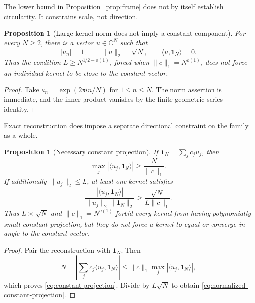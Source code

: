 \documentclass[11pt]{amsart}
\numberwithin{equation}{section}
\theoremstyle{plain}
\newtheorem{proposition}[theorem]{Proposition}
\theoremstyle{definition}
\theoremstyle{remark}
\newcommand{\one}{\mathbf 1}
\begin{document}
The lower bound in Proposition~\ref{prop:frame} does not by itself establish
circularity.  It constrains scale, not direction.

\begin{proposition}[Large kernel norm does not imply a constant component]
\label{prop:norm-not-alignment}
For every \(N\geq2\), there is a vector \(u\in\mathbb C^N\) such that
\begin{equation}\label{eq:oscillatory-large-vector}
  |u_n|=1,\qquad \|u\|_2=\sqrt N,
  \qquad \langle u,\one_N\rangle=0.
\end{equation}
Thus the condition \(L\geq N^{1/2-o(1)}\), forced when
\(\|c\|_1=N^{o(1)}\), does not force an individual kernel to be close to the
constant vector.
\end{proposition}

\begin{proof}
Take \(u_n=\exp(2\pi i n/N)\) for \(1\leq n\leq N\).  The norm assertion is
immediate, and the inner product vanishes by the finite geometric-series
identity.
\end{proof}

Exact reconstruction does impose a separate directional constraint on the
family as a whole.

\begin{proposition}[Necessary constant projection]
\label{prop:constant-projection}
If \(\one_N=\sum_jc_ju_j\), then
\begin{equation}\label{eq:constant-projection}
  \max_j|\langle u_j,\one_N\rangle|
  \geq \frac{N}{\|c\|_1}.
\end{equation}
If additionally \(\|u_j\|_2\leq L\), at least one kernel satisfies
\begin{equation}\label{eq:normalized-constant-projection}
  \frac{|\langle u_j,\one_N\rangle|}
       {\|u_j\|_2\|\one_N\|_2}
  \geq \frac{\sqrt N}{L\|c\|_1}.
\end{equation}
Thus \(L\asymp\sqrt N\) and \(\|c\|_1=N^{o(1)}\) forbid every kernel from
having polynomially small constant projection, but they do not force a kernel
to equal or converge in angle to the constant vector.
\end{proposition}

\begin{proof}
Pair the reconstruction with \(\one_N\).  Then
\begin{equation}\label{eq:constant-projection-proof}
  N=\left|\sum_jc_j\langle u_j,\one_N\rangle\right|
  \leq \|c\|_1\max_j|\langle u_j,\one_N\rangle|,
\end{equation}
which proves \eqref{eq:constant-projection}.  Divide by
\(L\sqrt N\) to obtain \eqref{eq:normalized-constant-projection}.
\end{proof}
\end{document}
